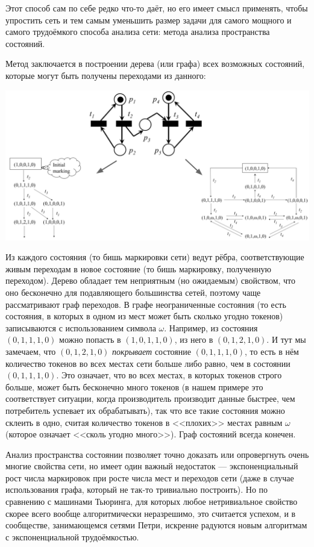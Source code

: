 \documentclass[a5paper]{article}
\begin{document}
Этот способ сам по себе редко что-то даёт, но его имеет смысл применять, чтобы упростить сеть и тем самым уменьшить размер задачи для самого мощного и самого трудоёмкого способа анализа сети: метода анализа пространства состояний.

Метод заключается в построении дерева (или графа) всех возможных состояний, которые могут быть получены переходами из данного:

\begin{center}
    \includegraphics[width=\textwidth]{petriStateSpaceAnalysis.png}
\end{center}

Из каждого состояния (то бишь маркировки сети) ведут рёбра, соответствующие живым переходам в новое состояние (то бишь маркировку, полученную переходом). Дерево обладает тем неприятным (но ожидаемым) свойством, что оно бесконечно для подавляющего большинства сетей, поэтому чаще рассматривают граф переходов. В графе неограниченные состояния (то есть состояния, в которых в одном из мест может быть сколько угодно токенов) записываются с использованием символа $\omega$. Например, из состояния $(0, 1, 1, 1, 0)$ можно попасть в $(1, 0, 1, 1, 0)$, из него в $(0, 1, 2, 1, 0)$. И тут мы замечаем, что $(0, 1, 2, 1, 0)$ \textit{покрывает} состояние $(0, 1, 1, 1, 0)$, то есть в нём количество токенов во всех местах сети больше либо равно, чем в состоянии $(0, 1, 1, 1, 0)$. Это означает, что во всех местах, в которых токенов строго больше, может быть бесконечно много токенов (в нашем примере это соответствует ситуации, когда производитель производит данные быстрее, чем потребитель успевает их обрабатывать), так что все такие состояния можно склеить в одно, считая количество токенов в <<плохих>> местах равным $\omega$ (которое означает <<сколь угодно много>>). Граф состояний всегда конечен.

Анализ пространства состоянии позволяет точно доказать или опровергнуть очень многие свойства сети, но имеет один важный недостаток --- экспоненциальный рост числа маркировок при росте числа мест и переходов сети (даже в случае использования графа, который не так-то тривиально построить). Но по сравнению с машинами Тьюринга, для которых любое нетривиальное свойство скорее всего вообще алгоритмически неразрешимо, это считается успехом, и в сообществе, занимающемся сетями Петри, искренне радуются новым алгоритмам с экспоненциальной трудоёмкостью.
\end{document}
